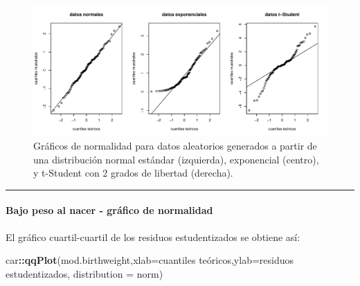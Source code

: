 \documentclass[
]{article}
\newenvironment{Shaded}{\begin{snugshade}}{\end{snugshade}}
\newcommand{\AttributeTok}[1]{\textcolor[rgb]{0.13,0.29,0.53}{#1}}
\newcommand{\FunctionTok}[1]{\textcolor[rgb]{0.13,0.29,0.53}{\textbf{#1}}}
\newcommand{\NormalTok}[1]{#1}
\newcommand{\SpecialCharTok}[1]{\textcolor[rgb]{0.81,0.36,0.00}{\textbf{#1}}}
\newcommand{\StringTok}[1]{\textcolor[rgb]{0.31,0.60,0.02}{#1}}
\begin{document}
\begin{figure}

{\centering \includegraphics{MLG1_files/figure-latex/qqplots-1} 

}

\caption{Gráficos de normalidad para datos aleatorios generados a partir de una distribución normal estándar (izquierda), exponencial (centro), y t-Student con 2 grados de libertad (derecha).}\label{fig:qqplots}
\end{figure}

\rule{\textwidth}{0.4pt}

\hypertarget{bajo-peso-al-nacer---gruxe1fico-de-normalidad}{%
\paragraph*{Bajo peso al nacer - gráfico de normalidad}\label{bajo-peso-al-nacer---gruxe1fico-de-normalidad}}

El gráfico cuartil-cuartil de los residuos estudentizados se obtiene así:

\begin{Shaded}
\begin{Highlighting}[]
\NormalTok{car}\SpecialCharTok{::}\FunctionTok{qqPlot}\NormalTok{(mod.birthweight,}\AttributeTok{xlab=}\StringTok{\textquotesingle{}cuantiles teóricos\textquotesingle{}}\NormalTok{,}\AttributeTok{ylab=}\StringTok{\textquotesingle{}residuos estudentizados\textquotesingle{}}\NormalTok{,}
       \AttributeTok{distribution =} \StringTok{\textquotesingle{}norm\textquotesingle{}}\NormalTok{)}
\end{Highlighting}
\end{Shaded}
\end{document}
